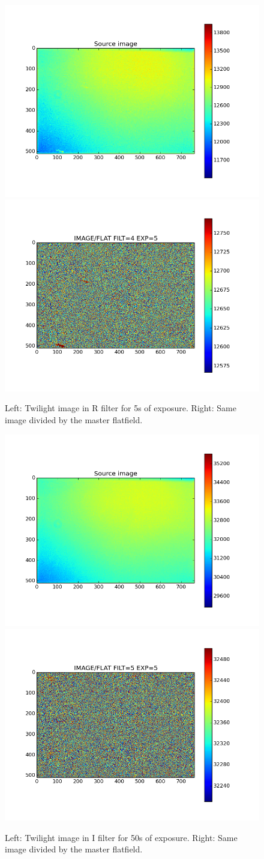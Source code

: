\documentclass[\docopts]{\docclass}
\begin{document}
\begin{figure}
\centering
\includegraphics[width=0.45\linewidth]{source_image_filter=4_t=5.png}
\includegraphics[width=0.45\linewidth]{comp_flat_image_filter=4_t=5.png}
\caption{Left: Twilight image in R filter for 5s of exposure. Right:
  Same image divided by the master flatfield. }
\label{fig:twilight_image_f_4}
\end{figure}

\begin{figure}
\centering
\includegraphics[width=0.45\linewidth]{source_image_filter=5_t=5.png}
\includegraphics[width=0.45\linewidth]{comp_flat_image_filter=5_t=5.png}
\caption{Left: Twilight image in I filter for 50s of exposure. Right:
  Same image divided by the master flatfield. }
\label{fig:twilight_image_f_5}
\end{figure}
\end{document}
